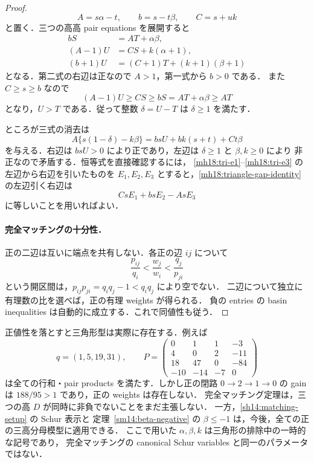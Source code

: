 \begin{proof}
\[
 A=s\alpha-t,\qquad b=s-t\beta,\qquad C=s+uk
\]
と置く．三つの高高 pair equations を展開すると
\begin{align}
 bS&=AT+\alpha\beta,\label{mh18:tri-e1}\\
 (A-1)U&=CS+k(\alpha+1),\label{mh18:tri-e2}\\
 (b+1)U&=(C+1)T+(k+1)(\beta+1)\label{mh18:tri-e3}
\end{align}
となる．第二式の右辺は正なので $A>1$，第一式から $b>0$ である．
また $C\ge s\ge b$ なので
\[
 (A-1)U\ge CS\ge bS=AT+\alpha\beta\ge AT
\]
となり，$U>T$ である．従って整数 $\delta=U-T$ は $\delta\ge1$ を満たす．

ところが三式の消去は
\begin{equation}\label{mh18:triangle-gap-identity}
 A\{s(1-\delta)-k\beta\}
 =bsU+bk(s+t)+Ct\beta
\end{equation}
を与える．右辺は $bsU>0$ により正であり，左辺は $\delta\ge1$ と $\beta,k\ge0$ により
非正なので矛盾する．恒等式を直接確認するには，
\eqref{mh18:tri-e1}--\eqref{mh18:tri-e3} の左辺から右辺を引いたものを
$E_1,E_2,E_3$ とすると，\eqref{mh18:triangle-gap-identity} の左辺引く右辺は
\[
 CsE_1+bsE_2-AsE_3
\]
に等しいことを用いればよい．

\paragraph{完全マッチングの十分性．}
正の二辺は互いに端点を共有しない．各正の辺 $ij$ について
\[
 \frac{p_{ij}}{q_i}<\frac{w_j}{w_i}<\frac{q_j}{p_{ji}}
\]
という開区間は，$p_{ij}p_{ji}=q_iq_j-1<q_iq_j$ により空でない．
二辺について独立に有理数の比を選べば，正の有理 weights が得られる．
負の entries の basin inequalities は自動的に成立する．これで同値性も従う．
\end{proof}

\begin{remark}[正値性の仮定と適用範囲]
\label{mh18:positivity-essential}
正値性を落とすと三角形型は実際に存在する．例えば
\[
 q=(1,5,19,31),\qquad
 P=\begin{pmatrix}
 0&1&1&-3\\
 4&0&2&-11\\
 18&47&0&-84\\
 -10&-14&-7&0
 \end{pmatrix}
\]
は全ての行和・pair products を満たす．しかし正の閉路 $0\to2\to1\to0$ の gain は
$188/95>1$ であり，正の weights は存在しない．
完全マッチング定理は，三つの高 $D$ が同時に非負でないことをまだ主張しない．
一方，\ref{sh14:matching-setup} の Schur 表示と
定理~\ref{sm14:beta-negative} の $\beta\le-1$ は，今後，全ての正の三高分母模型に適用できる．
ここで用いた $\alpha,\beta,k$ は三角形の排除中の一時的な記号であり，
完全マッチングの canonical Schur variables と同一のパラメータではない．
\end{remark}
